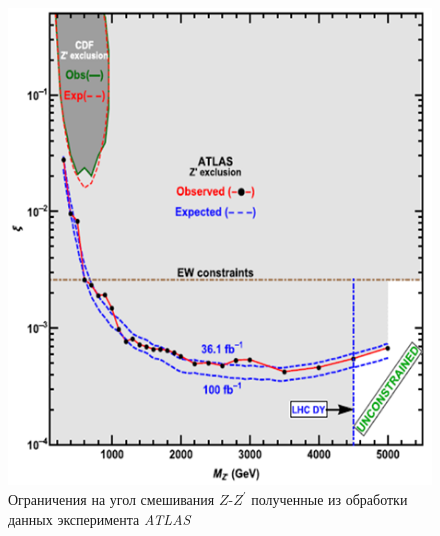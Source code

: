 \begin{figure}[!h]
	\centering
	\includegraphics[width=\textwidth]{figures/verify-1.png}
	\caption{Ограничения на угол смешивания $Z$-${Z}^{\prime}$ полученные из обработки данных эксперимента \textit{ATLAS}}
	\label{fig:verify-1}
\end{figure}

